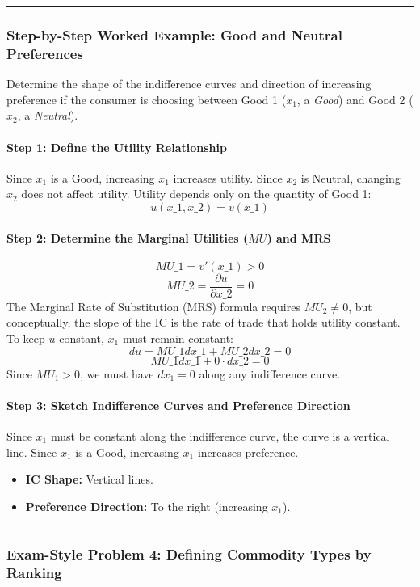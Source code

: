 \documentclass{article}
\begin{document}
\noindent\rule{\linewidth}{0.4pt}

\subsubsection*{Step-by-Step Worked Example: Good and Neutral Preferences}

Determine the shape of the indifference curves and direction of increasing preference if the consumer is choosing between Good 1 ($x_1$, a \textit{Good}) and Good 2 ($x_2$, a \textit{Neutral}).

\paragraph*{Step 1: Define the Utility Relationship}
Since $x_1$ is a Good, increasing $x_1$ increases utility. Since $x_2$ is Neutral, changing $x_2$ does not affect utility. Utility depends only on the quantity of Good 1:
$$u(x\_1, x\_2) = v(x\_1)$$

\paragraph*{Step 2: Determine the Marginal Utilities ($MU$) and MRS}
$$MU\_1 = v'(x\_1) > 0$$
$$MU\_2 = \frac{\partial u}{\partial x\_2} = 0$$
The Marginal Rate of Substitution (MRS) formula requires $MU_2 \neq 0$, but conceptually, the slope of the IC is the rate of trade that holds utility constant. To keep $u$ constant, $x_1$ must remain constant:
$$du = MU\_1 dx\_1 + MU\_2 dx\_2 = 0$$
$$MU\_1 dx\_1 + 0 \cdot dx\_2 = 0$$
Since $MU_1 > 0$, we must have $dx_1 = 0$ along any indifference curve.

\paragraph*{Step 3: Sketch Indifference Curves and Preference Direction}
Since $x_1$ must be constant along the indifference curve, the curve is a vertical line. Since $x_1$ is a Good, increasing $x_1$ increases preference.

\begin{itemize}
    \item \textbf{IC Shape:} Vertical lines.
    \item \textbf{Preference Direction:} To the right (increasing $x_1$).
\end{itemize}

\noindent\rule{\linewidth}{0.4pt}

\subsubsection*{Exam-Style Problem 4: Defining Commodity Types by Ranking}
\end{document}
